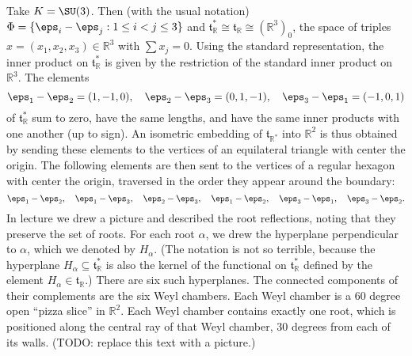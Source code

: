 \documentclass[reqno]{amsart} 
\begin{document}
\begin{example}
  Take $K = \SU(3)$.  Then (with the usual notation) $\Phi = \{\eps_i - \eps_j : 1 \leq i < j \leq 3\}$ and $\mathfrak{t}_{\mathbb{R}}^* \cong \mathfrak{t}_{\mathbb{R}} \cong (\mathbb{R}^3)_0$, the space of triples $x = (x_1,x_2,x_3) \in \mathbb{R}^3$ with $\sum x_j = 0$.  Using the standard representation, the inner product on $\mathfrak{t}_{\mathbb{R}}^*$ is given by the restriction of the standard inner product on $\mathbb{R}^3$.  The elements
  \begin{equation*}
    \eps_1 - \eps_2 = (1,-1,0), \quad \eps_2 - \eps_3 = (0,1,-1), \quad \eps_3 - \eps_1 = (-1,0,1)
  \end{equation*}
  of $\mathfrak{t}_{\mathbb{R}}^*$ sum to zero, have the same lengths, and have the same inner products with one another (up to sign).  An isometric embedding of $\mathfrak{t}_{\mathbb{R}^*}$ into $\mathbb{R}^2$ is thus obtained by sending these elements to the vertices of an equilateral triangle with center the origin.  The following elements are then sent to the vertices of a regular hexagon with center the origin, traversed in the order they appear around the boundary:
  \begin{equation*}
    \eps_1 - \eps_2, \quad \eps_1 - \eps_3, \quad \eps_2 - \eps_3, \quad \eps_1 - \eps_2, \quad \eps_3 - \eps_1, \quad \eps_3 - \eps_2.
  \end{equation*}
  In lecture we drew a picture and described the root reflections, noting that they preserve the set of roots.  For each root $\alpha$, we drew the hyperplane perpendicular to $\alpha$, which we denoted by $H_{\alpha}$.  (The notation is not so terrible, because the hyperplane $H_\alpha \subseteq \mathfrak{t}_{\mathbb{R}}^*$ is also the kernel of the functional on $\mathfrak{t}_{\mathbb{R}}^*$ defined by the element $H_{\alpha} \in \mathfrak{t}_{\mathbb{R}}$.)  There are six such hyperplanes.  The connected components of their complements are the six Weyl chambers.  Each Weyl chamber is a $60$ degree open ``pizza slice'' in $\mathbb{R}^2$.  Each Weyl chamber contains exactly one root, which is positioned along the central ray of that Weyl chamber, $30$ degrees from each of its walls.  (TODO: replace this text with a picture.)
\end{example}
\end{document}
